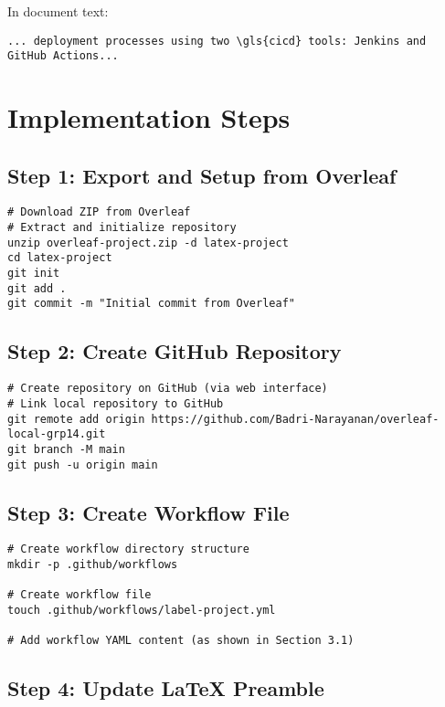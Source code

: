 In document text:

\begin{verbatim}
... deployment processes using two \gls{cicd} tools: Jenkins and GitHub Actions...
\end{verbatim}

\section{Implementation Steps}

\subsection{Step 1: Export and Setup from Overleaf}

\begin{verbatim}
# Download ZIP from Overleaf
# Extract and initialize repository
unzip overleaf-project.zip -d latex-project
cd latex-project
git init
git add .
git commit -m "Initial commit from Overleaf"
\end{verbatim}

\subsection{Step 2: Create GitHub Repository}

\begin{verbatim}
# Create repository on GitHub (via web interface)
# Link local repository to GitHub
git remote add origin https://github.com/Badri-Narayanan/overleaf-local-grp14.git
git branch -M main
git push -u origin main
\end{verbatim}

\subsection{Step 3: Create Workflow File}

\begin{verbatim}
# Create workflow directory structure
mkdir -p .github/workflows

# Create workflow file
touch .github/workflows/label-project.yml

# Add workflow YAML content (as shown in Section 3.1)
\end{verbatim}

\subsection{Step 4: Update LaTeX Preamble}

